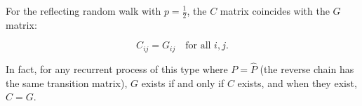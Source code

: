 For the reflecting random walk with $p = \frac{1}{2}$, the $C$ matrix coincides with the $G$ matrix:

$$C_{ij} = G_{ij} \quad \text{for all } i, j.$$

In fact, for any recurrent process of this type where $P = \hat{P}$ (the reverse chain has the same transition matrix), $G$ exists if and only if $C$ exists, and when they exist, $C = G$.

